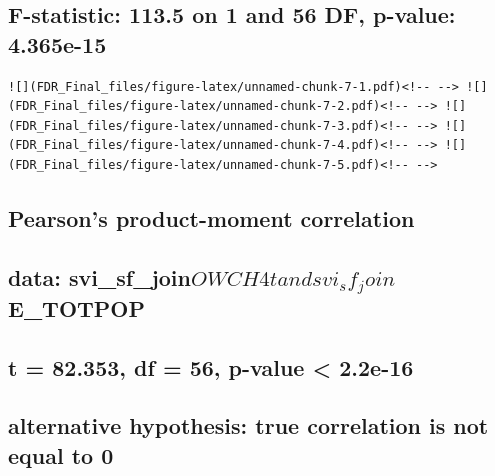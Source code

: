 \documentclass[
  12pt,
]{article}
\begin{document}
\hypertarget{f-statistic-113.5-on-1-and-56-df-p-value-4.365e-15}{%
\subsection{F-statistic: 113.5 on 1 and 56 DF, p-value:
4.365e-15}\label{f-statistic-113.5-on-1-and-56-df-p-value-4.365e-15}}

\begin{verbatim}
![](FDR_Final_files/figure-latex/unnamed-chunk-7-1.pdf)<!-- --> ![](FDR_Final_files/figure-latex/unnamed-chunk-7-2.pdf)<!-- --> ![](FDR_Final_files/figure-latex/unnamed-chunk-7-3.pdf)<!-- --> ![](FDR_Final_files/figure-latex/unnamed-chunk-7-4.pdf)<!-- --> ![](FDR_Final_files/figure-latex/unnamed-chunk-7-5.pdf)<!-- --> 
\end{verbatim}

\hypertarget{section-10}{%
\subsection{}\label{section-10}}

\hypertarget{pearsons-product-moment-correlation-1}{%
\subsection{Pearson's product-moment
correlation}\label{pearsons-product-moment-correlation-1}}

\hypertarget{section-11}{%
\subsection{}\label{section-11}}

\hypertarget{data-svi_sf_joinowch4t-and-svi_sf_joine_totpop}{%
\subsection{\texorpdfstring{data:
svi\_sf\_join\(OWCH4t and svi_sf_join\)E\_TOTPOP}{data: svi\_sf\_joinOWCH4t and svi\_sf\_joinE\_TOTPOP}}\label{data-svi_sf_joinowch4t-and-svi_sf_joine_totpop}}

\hypertarget{t-82.353-df-56-p-value-2.2e-16}{%
\subsection{t = 82.353, df = 56, p-value \textless{}
2.2e-16}\label{t-82.353-df-56-p-value-2.2e-16}}

\hypertarget{alternative-hypothesis-true-correlation-is-not-equal-to-0-1}{%
\subsection{alternative hypothesis: true correlation is not equal to
0}\label{alternative-hypothesis-true-correlation-is-not-equal-to-0-1}}
\end{document}
